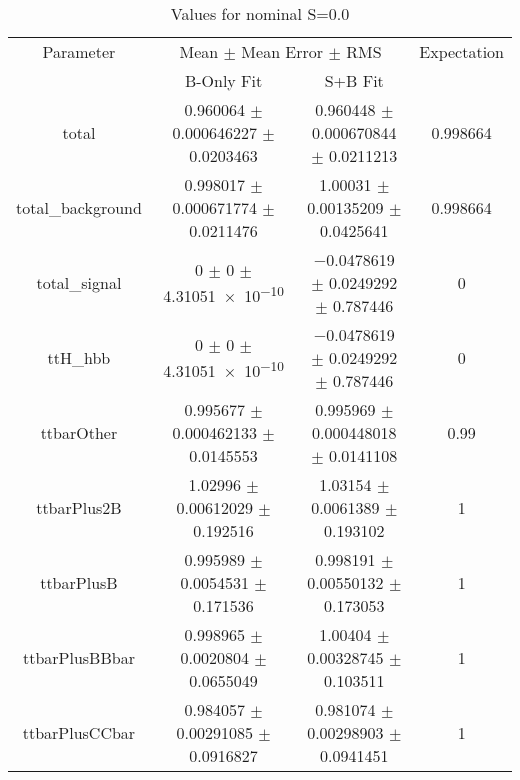 \begin{table}
\centering
\caption{Values for nominal S=0.0}
\begin{tabular}{cccc}
\toprule
Parameter & \multicolumn{2}{c}{Mean $\pm$ Mean Error $\pm$ RMS} & Expectation\\
 & B-Only Fit & S+B Fit & \\
\midrule
total & \num{0.960064} $\pm$ \num{0.000646227} $\pm$ \num{0.0203463} & \num{0.960448} $\pm$ \num{0.000670844} $\pm$ \num{0.0211213} & \num{0.998664}\\
total\_background & \num{0.998017} $\pm$ \num{0.000671774} $\pm$ \num{0.0211476} & \num{1.00031} $\pm$ \num{0.00135209} $\pm$ \num{0.0425641} & \num{0.998664}\\
total\_signal & \num{0} $\pm$ \num{0} $\pm$ \num{4.31051e-10} & \num{-0.0478619} $\pm$ \num{0.0249292} $\pm$ \num{0.787446} & \num{0}\\
ttH\_hbb & \num{0} $\pm$ \num{0} $\pm$ \num{4.31051e-10} & \num{-0.0478619} $\pm$ \num{0.0249292} $\pm$ \num{0.787446} & \num{0}\\
ttbarOther & \num{0.995677} $\pm$ \num{0.000462133} $\pm$ \num{0.0145553} & \num{0.995969} $\pm$ \num{0.000448018} $\pm$ \num{0.0141108} & \num{0.99}\\
ttbarPlus2B & \num{1.02996} $\pm$ \num{0.00612029} $\pm$ \num{0.192516} & \num{1.03154} $\pm$ \num{0.0061389} $\pm$ \num{0.193102} & \num{1}\\
ttbarPlusB & \num{0.995989} $\pm$ \num{0.0054531} $\pm$ \num{0.171536} & \num{0.998191} $\pm$ \num{0.00550132} $\pm$ \num{0.173053} & \num{1}\\
ttbarPlusBBbar & \num{0.998965} $\pm$ \num{0.0020804} $\pm$ \num{0.0655049} & \num{1.00404} $\pm$ \num{0.00328745} $\pm$ \num{0.103511} & \num{1}\\
ttbarPlusCCbar & \num{0.984057} $\pm$ \num{0.00291085} $\pm$ \num{0.0916827} & \num{0.981074} $\pm$ \num{0.00298903} $\pm$ \num{0.0941451} & \num{1}\\
\bottomrule
\end{tabular}
\end{table}